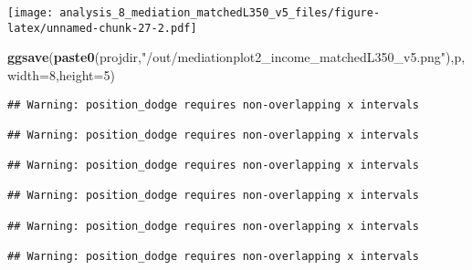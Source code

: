 \documentclass[
]{article}
\newenvironment{Shaded}{\begin{snugshade}}{\end{snugshade}}
\newcommand{\DataTypeTok}[1]{\textcolor[rgb]{0.13,0.29,0.53}{#1}}
\newcommand{\DecValTok}[1]{\textcolor[rgb]{0.00,0.00,0.81}{#1}}
\newcommand{\KeywordTok}[1]{\textcolor[rgb]{0.13,0.29,0.53}{\textbf{#1}}}
\newcommand{\NormalTok}[1]{#1}
\newcommand{\StringTok}[1]{\textcolor[rgb]{0.31,0.60,0.02}{#1}}
\begin{document}
\texttt{[image: analysis\_8\_mediation\_matchedL350\_v5\_files/figure-latex/unnamed-chunk-27-2.pdf]}

\begin{Shaded}
\begin{Highlighting}[]
\KeywordTok{ggsave}\NormalTok{(}\KeywordTok{paste0}\NormalTok{(projdir,}\StringTok{"/out/mediationplot2_income_matchedL350_v5.png"}\NormalTok{),p,}\DataTypeTok{width=}\DecValTok{8}\NormalTok{,}\DataTypeTok{height=}\DecValTok{5}\NormalTok{)}
\end{Highlighting}
\end{Shaded}

\begin{verbatim}
## Warning: position_dodge requires non-overlapping x intervals

## Warning: position_dodge requires non-overlapping x intervals

## Warning: position_dodge requires non-overlapping x intervals

## Warning: position_dodge requires non-overlapping x intervals

## Warning: position_dodge requires non-overlapping x intervals

## Warning: position_dodge requires non-overlapping x intervals
\end{verbatim}
\end{document}
